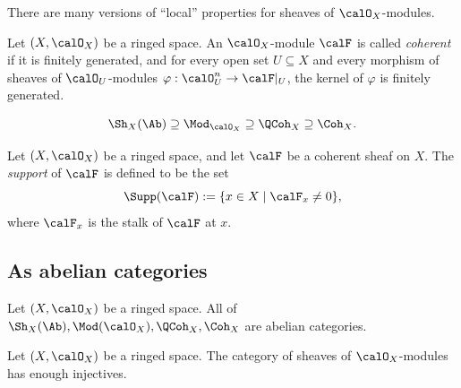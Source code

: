     \begin{remark}\label{rmk:local_properties_of_sheaves}
        There are many versions of ``local'' properties for sheaves of \(\calO_X\)-modules.
    \end{remark}

    \begin{definition}\label{def:coherent_sheaf}
        Let \((X,\calO_X)\) be a ringed space.
        An \(\calO_X\)-module \(\calF\) is called \emph{coherent} if it is finitely generated, and for every open set \(U\subseteq X\) and every morphism of sheaves of \(\calO_U\)-modules \(\varphi:\calO_U^n \to \calF|_U\), the kernel of \(\varphi\) is finitely generated.
    \end{definition}

    \begin{slogan}\label{slogan:categories_of_some_specific_sheaves}
        \[ \Sh_X(\Ab) \supseteq \Mod_{\calO_X} \supseteq \QCoh_X \supseteq \Coh_X. \]
    \end{slogan}

    \begin{definition}\label{def:support_of_coherent_sheaves}
        Let \((X,\calO_X)\) be a ringed space, and let \(\calF\) be a coherent sheaf on \(X\).
        The \emph{support} of \(\calF\) is defined to be the set
        \[
            \Supp(\calF) := \{ x \in X \mid \calF_x \neq 0 \},
        \]
        where \(\calF_x\) is the stalk of \(\calF\) at \(x\).
    \end{definition}

\subsection{As abelian categories}

    \begin{theorem}\label{thm:sheaves_of_ab_mod_qcoh_coh_are_abelian_categories}
        Let \((X,\calO_X)\) be a ringed space.
        All of \(\Sh_X(\Ab), \Mod(\calO_X), \QCoh_X, \Coh_X\) are abelian categories.
    \end{theorem}

    \begin{theorem}\label{thm:O_X_mod_has_enough_injectives}
        Let \((X,\calO_X)\) be a ringed space.
        The category of sheaves of \(\calO_X\)-modules has enough injectives.
    \end{theorem}

